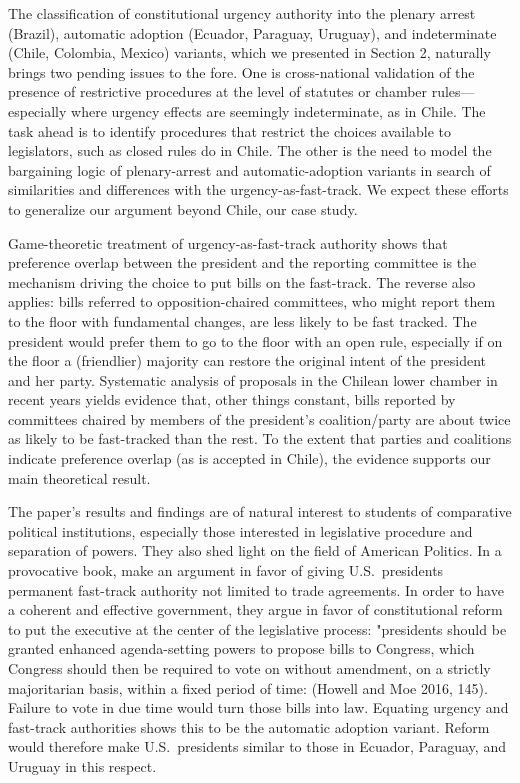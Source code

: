 \documentclass[letter,12pt]{article}
\begin{document}
The classification of constitutional urgency authority into the plenary arrest (Brazil), automatic adoption (Ecuador, Paraguay, Uruguay), and indeterminate (Chile, Colombia, Mexico) variants, which we presented in Section 2, naturally brings two pending issues to the fore. One is cross-national validation of the presence of restrictive procedures at the level of statutes or chamber rules---especially where urgency effects are seemingly indeterminate, as in Chile. The task ahead is to identify procedures that restrict the choices available to legislators, such as closed rules do in Chile. The other is the need to model the bargaining logic of plenary-arrest and automatic-adoption variants in search of similarities and differences with the urgency-as-fast-track. We expect these efforts to generalize our argument beyond Chile, our case study. %

Game-theoretic treatment of urgency-as-fast-track authority shows that preference overlap between the president and the reporting committee is the mechanism driving the choice to put bills on the fast-track. The reverse also applies: bills referred to opposition-chaired committees, who might report them to the floor with fundamental changes, are less likely to be fast tracked. The president would prefer them to go to the floor with an open rule, especially if on the floor a (friendlier) majority can restore the original intent of the president and her party. Systematic analysis of proposals in the Chilean lower chamber in recent years yields evidence that, other things constant, bills reported by committees chaired by members of the president's coalition/party are about twice as likely to be fast-tracked than the rest. To the extent that parties and coalitions indicate preference overlap (as is accepted in Chile), the evidence supports our main theoretical result.

The paper's results and findings are of natural interest to students of comparative political institutions, especially those interested in legislative procedure and separation of powers. They also shed light on the field of American Politics. In a provocative book, \citet{howell.moe.Relic2016} make an argument in favor of giving U.S.\ presidents permanent fast-track authority not limited to trade agreements. In order to have a coherent and effective government, they argue in favor of constitutional reform to put the executive at the center of the legislative process: "presidents should be granted enhanced agenda-setting powers to propose bills to Congress, which Congress should then be required to vote on without amendment, on a strictly majoritarian basis, within a fixed period of time: (Howell and Moe 2016, 145). Failure to vote in due time would turn those bills into law. Equating urgency and fast-track authorities shows this to be the automatic adoption variant. Reform would therefore make U.S.\ presidents similar to those in Ecuador, Paraguay, and Uruguay in this respect. 
\end{document}
